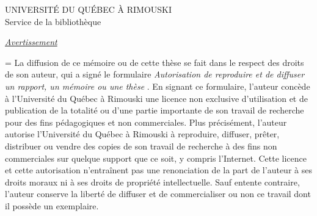 \thispagestyle{empty}

{\selectfont
{
\begin{center}
UNIVERSITÉ DU QUÉBEC À RIMOUSKI\\
Service de la bibliothèque
\end{center}
}
\vspace{3cm}
\begin{center}
\underline{\itshape Avertissement}
\vspace{1.5cm}
\end{center}
{
\emergencystretch=\maxdimen
{}
\noindent La diffusion de ce mémoire ou de cette thèse se fait dans le respect des droits de son auteur, qui a signé le formulaire {\itshape \og Autorisation de reproduire et de diffuser un rapport, un mémoire ou une thèse \fg}.
En signant ce formulaire, l’auteur concède à l’Université du Québec à Rimouski une licence non exclusive d’utilisation et de publication de la totalité ou d’une partie importante de son travail de recherche pour des fins pédagogiques et non commerciales.
Plus précisément, l’auteur autorise l’Université du Québec à Rimouski à reproduire, diffuser, prêter, distribuer ou vendre des copies de son travail de recherche à des fins non commerciales sur quelque support que ce soit, y compris l’Internet.
Cette licence et cette autorisation n’entraînent pas une renonciation de la part de l’auteur à ses droits moraux ni à ses droits de propriété intellectuelle.
Sauf entente contraire, l’auteur conserve la liberté de diffuser et de commercialiser ou non ce travail dont il possède un exemplaire.\par
}
}
 \restoregeometry
